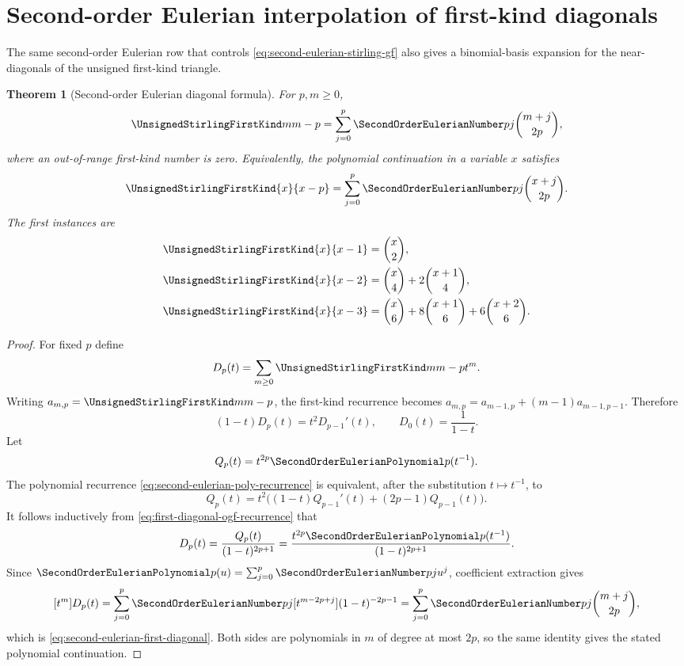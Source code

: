 \documentclass[11pt,a4paper,oneside,openany]{book}
\newtheorem{theorem}{Theorem}[chapter]
\theoremstyle{definition}
\theoremstyle{remark}
\begin{document}
\section{Second-order Eulerian interpolation of first-kind diagonals}
The same second-order Eulerian row that controls
\eqref{eq:second-eulerian-stirling-gf} also gives a binomial-basis expansion for
the near-diagonals of the unsigned first-kind triangle.

\begin{theorem}[Second-order Eulerian diagonal formula]
\label{thm:second-eulerian-first-diagonal}
For $p,m\ge0$,
\begin{equation}
\label{eq:second-eulerian-first-diagonal}
 \UnsignedStirlingFirstKind m{m-p}
 =\sum_{j=0}^{p}\SecondOrderEulerianNumber pj\binom{m+j}{2p},
\end{equation}
where an out-of-range first-kind number is zero.  Equivalently, the polynomial
continuation in a variable $x$ satisfies
\[
 \UnsignedStirlingFirstKind{x}{x-p}
 =\sum_{j=0}^{p}\SecondOrderEulerianNumber pj\binom{x+j}{2p}.
\]
The first instances are
\begin{align*}
 \UnsignedStirlingFirstKind{x}{x-1}&=\binom{x}{2},\\
 \UnsignedStirlingFirstKind{x}{x-2}&=\binom{x}{4}+2\binom{x+1}{4},\\
 \UnsignedStirlingFirstKind{x}{x-3}&=\binom{x}{6}+8\binom{x+1}{6}
                    +6\binom{x+2}{6}.
\end{align*}
\end{theorem}
\begin{proof}
For fixed $p$ define
\[
 D_p(t)=\sum_{m\ge0}\UnsignedStirlingFirstKind m{m-p}t^m.
\]
Writing $a_{m,p}=\UnsignedStirlingFirstKind m{m-p}$, the first-kind recurrence becomes
$a_{m,p}=a_{m-1,p}+(m-1)a_{m-1,p-1}$.  Therefore
\begin{equation}
\label{eq:first-diagonal-ogf-recurrence}
 (1-t)D_p(t)=t^2D_{p-1}'(t),
 \qquad D_0(t)=\frac1{1-t}.
\end{equation}
Let
\[
 Q_p(t)=t^{2p}\SecondOrderEulerianPolynomial p(t^{-1}).
\]
The polynomial recurrence \eqref{eq:second-eulerian-poly-recurrence} is equivalent,
after the substitution $t\mapsto t^{-1}$, to
\[
 Q_p(t)=t^2\bigl((1-t)Q_{p-1}'(t)+(2p-1)Q_{p-1}(t)\bigr).
\]
It follows inductively from \eqref{eq:first-diagonal-ogf-recurrence} that
\begin{equation}
\label{eq:first-diagonal-second-eulerian-ogf}
 D_p(t)=\frac{Q_p(t)}{(1-t)^{2p+1}}
 =\frac{t^{2p}\SecondOrderEulerianPolynomial p(t^{-1})}{(1-t)^{2p+1}}.
\end{equation}
Since $\SecondOrderEulerianPolynomial p(u)=\sum_{j=0}^{p}\SecondOrderEulerianNumber pj u^j$, coefficient extraction gives
\[
 [t^m]D_p(t)
 =\sum_{j=0}^{p}\SecondOrderEulerianNumber pj
   [t^{m-2p+j}](1-t)^{-2p-1}
 =\sum_{j=0}^{p}\SecondOrderEulerianNumber pj\binom{m+j}{2p},
\]
which is \eqref{eq:second-eulerian-first-diagonal}.  Both sides are polynomials in
$m$ of degree at most $2p$, so the same identity gives the stated polynomial
continuation.
\end{proof}
\end{document}

